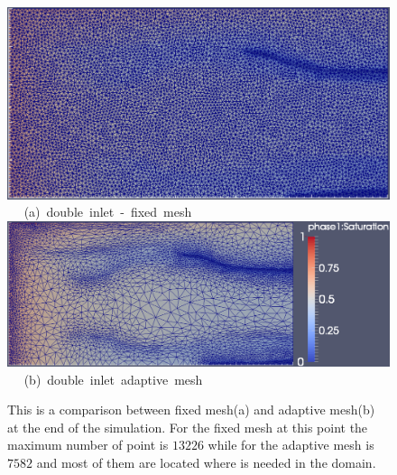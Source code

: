 \begin{landscape}
\begin{figure}[ht] 
\vbox{
\hbox{\hspace{3.5cm}
\includegraphics[width=.65\textwidth]{./Pics1/5reg_dinlet_fixed_end.pdf} 
}
\vspace{0.0cm}
\hbox{\hspace{6.5cm} (a) double inlet - fixed mesh   
}
\hbox{\hspace{3.5cm}
\includegraphics[width=.9\textwidth]{./Pics1/5reg_dinlet_adapt_end_1.pdf}
}
\vspace{0.0cm}
\hbox{\hspace{6.5cm} (b) double inlet adaptive mesh   
}
}     
\caption{This is a comparison between fixed mesh(a) and adaptive mesh(b) at the end of the simulation. For the fixed mesh at this point the maximum number of point is $13226$ while for the adaptive mesh is $7582$ and most of them are located where is needed in the domain.}
\label{fig:3testcase_d}
\end{figure}
\end{landscape}
\clearpage


